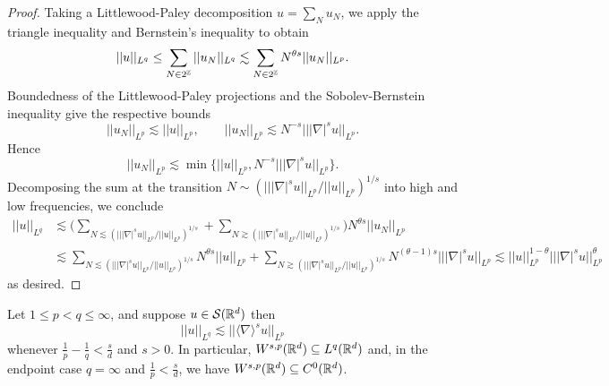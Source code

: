 \begin{proof}
	Taking a Littlewood-Paley decomposition $u = \sum_N u_N$, we apply the triangle inequality and Bernstein's inequality to obtain
	\begin{align*}
		||u||_{L^q}
			\leq \sum_{N \in 2^\mathbb Z} ||u_N||_{L^q} \lesssim \sum_{N \in 2^\mathbb Z} N^{\theta s} ||u_N||_{L^p}.
	\end{align*}
	Boundedness of the Littlewood-Paley projections and the Sobolev-Bernstein inequality give the respective bounds
		\[ ||u_N||_{L^p} \lesssim ||u||_{L^p}, \qquad ||u_N||_{L^p} \lesssim N^{-s} || |\nabla|^s u||_{L^p}.\]
	Hence
		\[ ||u_N||_{L^p} \lesssim \min \Big\{ ||u||_{L^p}, N^{-s} || |\nabla|^s u||_{L^p} \Big\}. \]
	Decomposing the sum at the transition $N \sim (|||\nabla|^s u||_{L^p}/||u||_{L^p})^{1/s}$ into high and low frequencies, we conclude
		\begin{align*}
			||u||_{L^q}
				&\lesssim \Big( \sum_{N \lesssim (|||\nabla|^s u||_{L^p}/||u||_{L^p})^{1/s}} + \sum_{N \gtrsim (|||\nabla|^s u||_{L^p}/||u||_{L^p})^{1/s}} \Big) N^{\theta s} ||u_N||_{L^p} \\
				&\lesssim \sum_{N \lesssim (|||\nabla|^s u||_{L^p}/||u||_{L^p})^{1/s}} N^{\theta s} ||u||_{L^p} + \sum_{N \gtrsim (|||\nabla|^s u||_{L^p}/||u||_{L^p})^{1/s}} N^{(\theta - 1) s}  |||\nabla|^s u||_{L^p} \lesssim ||u||_{L^p}^{1 - \theta} || |\nabla|^s u||_{L^p}^\theta 
		\end{align*}	
	as desired. 	
\end{proof}

\begin{theorem}
	Let $1 \leq p < q \leq \infty$, and suppose $u \in \mathcal S (\mathbb R^d)$ then 
		\[ ||u||_{L^q} \lesssim || \langle \nabla \rangle^s u ||_{L^p} \]
	whenever $\tfrac1p - \tfrac1q < \tfrac{s}{d}$ and $s > 0$. In particular, $W^{s, p} (\mathbb R^d) \subseteq L^q (\mathbb R^d)$ and, in the endpoint case $q = \infty$ and $\tfrac1p < \tfrac{s}{d}$, we have $W^{s, p} (\mathbb R^d) \subseteq C^0 (\mathbb R^d)$. 
\end{theorem}


